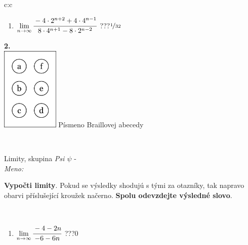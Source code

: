 \documentclass[10pt]{report}
\begin{document}
\begin{tabular}{c:c}
\begin{minipage}[c][104.5mm][t]{0.5\linewidth}
\begin{center}
\begin{minipage}{0.79\linewidth}
\begin{center}
\begin{varwidth}{\linewidth}
\begin{enumerate}
\item $\lim\limits_{n\to\infty}\cfrac{-4\cdot 2^{n+2}+4\cdot 4^{n-1}}{8\cdot 4^{n+1}-8\cdot 2^{n-2}}$\quad \dotfill\; ???\;\dotfill \quad $\nicefrac{1}{32}$
\end{enumerate}
\end{varwidth}
\end{center}
\end{minipage}
\begin{minipage}{0.20\linewidth}
\begin{center}
{\Huge\bfseries 2.} \\[2mm]
\includegraphics[height=40mm]{../images/braille.png}
{\small Písmeno Braillovej abecedy}
\end{center}
\end{minipage}
\end{center}
\end{minipage}
\\ \hdashline
\begin{minipage}[c][104.5mm][t]{0.5\linewidth}
\begin{center}
\vspace{7mm}
{\huge Limity, skupina \textit{Psi $\psi$} -}\\[5mm]
\textit{Meno:}\phantom{xxxxxxxxxxxxxxxxxxxxxxxxxxxxxxxxxxxxxxxxxxxxxxxxxxxxxxxxxxxxxxxxx}\\[5mm]
\begin{minipage}{0.95\linewidth}
\begin{center}
\textbf{Vypočti limity}. Pokud se výsledky shodujú s tými za otazníky, tak napravo\\obarvi příslušející kroužek načerno. \textbf{Spolu odevzdejte výsledné slovo}.
\end{center}
\end{minipage}
\\[1mm]
\begin{minipage}{0.79\linewidth}
\begin{center}
\begin{varwidth}{\linewidth}
\begin{enumerate}
\normalsize
\item $\lim\limits_{n\to\infty}\cfrac{-4-2n}{-6-6n}$\quad \dotfill\; ???\;\dotfill \quad $0$

\end{enumerate}
\end{varwidth}
\end{center}
\end{minipage}
\end{center}
\end{minipage}
\end{tabular}
\end{document}
